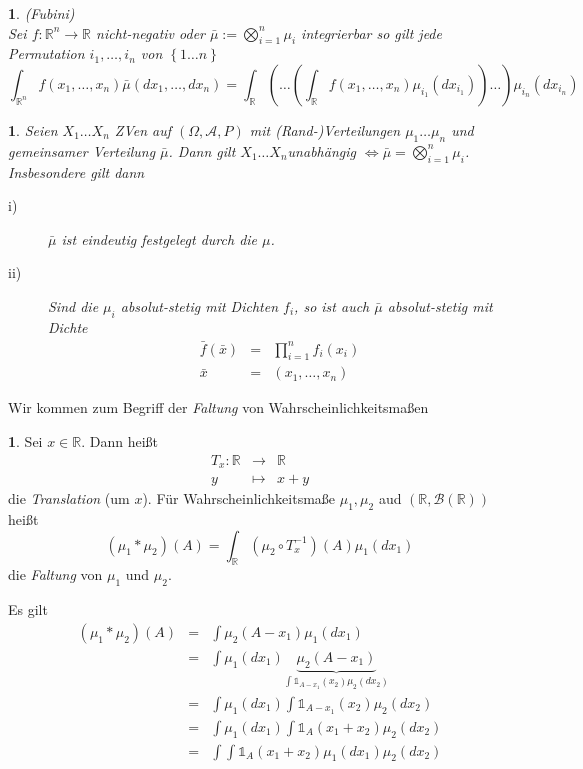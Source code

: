 \documentclass[10pt,a4paper]{report}
\numberwithin{equation}{section}
\numberwithin{figure}{section}
\theoremstyle{plain}
\theoremstyle{definition}
\newtheorem{defn}[thm]{\protect\definitionname}
\theoremstyle{remark}
\theoremstyle{plain}
\newtheorem{prop}[thm]{\protect\propositionname}
\newtheorem*{prop*}{\protect\propositionname}
\providecommand{\definitionname}{Definition}
\providecommand{\propositionname}{Satz}
\newcommand{\1}{ \mathbb{1} } %
\begin{document}
\begin{prop*}
(Fubini)\\
Sei $f:\mathbb{R}^{n}\to\mathbb{R}$ nicht-negativ oder $\bar{\mu}:=\bigotimes_{i=1}^{n}\mu_{i}$
integrierbar so gilt jede Permutation $i_{1},\ldots,i_{n}$ von $\left\{ 1\ldots n\right\} $
\[
\int_{\mathbb{R}^{n}}f\left(x_{1},\ldots,x_{n}\right)\bar{\mu}\left(dx_{1},\ldots,dx_{n}\right)=\int_{\mathbb{R}}\left(\ldots\left(\int_{\mathbb{R}}f\left(x_{1},\ldots,x_{n}\right)\mu_{i_{1}}\left(dx_{i_{1}}\right)\right)\ldots\right)\mu_{i_{n}}\left(dx_{i_{n}}\right)
\]
\end{prop*}
\begin{prop}
Seien $X_{1}\ldots X_{n}$ ZVen auf $\left(\Omega,\mathcal{A},P\right)$
mit (Rand-)Verteilungen $\mu_{1}\ldots\mu_{n}$ und gemeinsamer Verteilung
$\bar{\mu}$. Dann gilt $X_{1}\ldots X_{n}$unabhängig $\Leftrightarrow\bar{\mu}=\bigotimes_{i=1}^{n}\mu_{i}$.
Insbesondere gilt dann
\begin{description}
\item [{i)}] $\bar{\mu}$ ist eindeutig festgelegt durch die $\mu$. 
\item [{ii)}] Sind die $\mu_{i}$ absolut-stetig mit Dichten $f_{i}$,
so ist auch $\bar{\mu}$ absolut-stetig mit Dichte
\begin{eqnarray*}
\bar{f}\left(\bar{x}\right) & = & \prod_{i=1}^{n}f_{i}\left(x_{i}\right)\\
\bar{x} & = & \left(x_{1},\ldots,x_{n}\right)
\end{eqnarray*}

\end{description}
\end{prop}
Wir kommen zum Begriff der \emph{Faltung} von Wahrscheinlichkeitsmaßen
\begin{defn}
Sei $x\in\mathbb{R}$. Dann heißt 
\begin{eqnarray*}
T_{x}:\mathbb{R} & \to & \mathbb{R}\\
y & \mapsto & x+y
\end{eqnarray*}
die \emph{Translation} (um $x$). Für Wahrscheinlichkeitsmaße $\mu_{1},\mu_{2}$
aud $\left(\mathbb{R},\mathcal{B}\left(\mathbb{R}\right)\right)$
heißt 
\[
\left(\mu_{1}*\mu_{2}\right)\left(A\right)=\int_{\mathbb{R}}\left(\mu_{2}\circ T_{x}^{-1}\right)\left(A\right)\mu_{1}\left(dx_{1}\right)
\]
die \emph{Faltung} von $\mu_{1}$ und $\mu_{2}$.
\end{defn}
Es gilt
\begin{eqnarray*}
\left(\mu_{1}*\mu_{2}\right)\left(A\right) & = & \int\mu_{2}\left(A-x_{1}\right)\mu_{1}\left(dx_{1}\right)\\
 & = & \int\mu_{1}\left(dx_{1}\right)\underset{\int\1_{A-x_{1}}\left(x_{2}\right)\mu_{2}\left(dx_{2}\right)}{\underbrace{\mu_{2}\left(A-x_{1}\right)}}\\
 & = & \int\mu_{1}\left(dx_{1}\right)\int\1_{A-x_{1}}\left(x_{2}\right)\mu_{2}\left(dx_{2}\right)\\
 & = & \int\mu_{1}\left(dx_{1}\right)\int\1_{A}\left(x_{1}+x_{2}\right)\mu_{2}\left(dx_{2}\right)\\
 & = & \int\int\1_{A}\left(x_{1}+x_{2}\right)\mu_{1}\left(dx_{1}\right)\mu_{2}\left(dx_{2}\right)
\end{eqnarray*}
\end{document}
